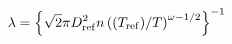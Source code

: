 \documentclass[12pt]{article}
\begin{document}
$$ 
  \lambda = \left\{ \sqrt{2}\pi D^{2}_{\rm ref} n \left ({(T_{\rm ref})}/{T} \right )^{\omega - 1/2} \right\} ^{-1}
$$
\end{document}

